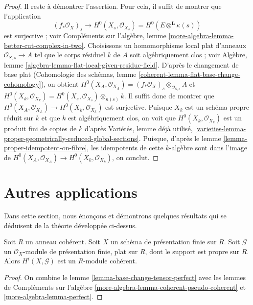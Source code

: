 \begin{proof}
\medskip\noindent
Il reste à démontrer l'assertion. Pour cela, il suffit de montrer que l'application
$$
(f_*\mathcal{O}_X)_s
\longrightarrow
H^0(X_s, \mathcal{O}_{X_s}) = H^0(E \otimes^\mathbf{L} \kappa(s))
$$
est surjective ; voir
Compléments sur l'algèbre, lemme \ref{more-algebra-lemma-better-cut-complex-in-two}.
Choisissons un homomorphisme local plat d'anneaux $\mathcal{O}_{S, s} \to A$
tel que le corps résiduel $k$ de $A$ soit algébriquement clos ; voir
Algèbre, lemme \ref{algebra-lemma-flat-local-given-residue-field}.
D'après le changement de base plat (Cohomologie des schémas, lemme
\ref{coherent-lemma-flat-base-change-cohomology}),
on obtient $H^0(X_A, \mathcal{O}_{X_A}) =
(f_*\mathcal{O}_X)_s \otimes_{\mathcal{O}_{S, s}} A$
et $H^0(X_k, \mathcal{O}_{X_k}) =
H^0(X_s, \mathcal{O}_{X_s}) \otimes_{\kappa(s)} k$.
Il suffit donc de montrer que
$H^0(X_A, \mathcal{O}_{X_A}) \to H^0(X_k, \mathcal{O}_{X_k})$
est surjective. Puisque $X_k$ est un schéma propre réduit sur $k$
et que $k$ est algébriquement clos, on voit que
$H^0(X_k, \mathcal{O}_{X_k})$ est un produit fini de copies
de $k$ d'après Variétés, lemme déjà utilisé,
\ref{varieties-lemma-proper-geometrically-reduced-global-sections}.
Puisque, d'après le lemme \ref{lemma-proper-idempotent-on-fibre},
les idempotents de cette $k$-algèbre sont dans l'image
de $H^0(X_A, \mathcal{O}_{X_A}) \to H^0(X_k, \mathcal{O}_{X_k})$, on conclut.
\end{proof}





\section{Autres applications}
\label{section-other-applications}

\noindent
Dans cette section, nous énonçons et démontrons quelques résultats qui se déduisent
de la théorie développée ci-dessus.

\begin{lemma}
\label{lemma-cohomology-over-coherent-ring}
Soit $R$ un anneau cohérent. Soit $X$ un schéma de présentation finie sur $R$.
Soit $\mathcal{G}$ un $\mathcal{O}_X$-module de présentation finie,
plat sur $R$, dont le support est propre sur $R$. Alors
$H^i(X, \mathcal{G})$ est un $R$-module cohérent.
\end{lemma}

\begin{proof}
On combine le lemme \ref{lemma-base-change-tensor-perfect} avec les
lemmes de Compléments sur l'algèbre \ref{more-algebra-lemma-coherent-pseudo-coherent} et
\ref{more-algebra-lemma-perfect}.
\end{proof}

